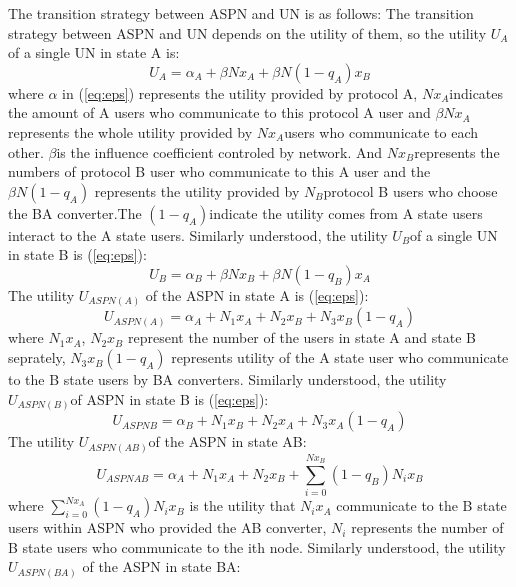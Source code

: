 \documentclass{article}
\begin{document}
The transition strategy between ASPN and UN is as follows:
The transition strategy between ASPN and UN depends on the utility of them, so the utility \(U_{A}\) of a single UN
in state A is:
\begin{displaymath} \label{eq:eps}
U_{A}=\alpha_{A}+\beta Nx_{A}+\beta N(1-q_{A})x_{B}
\end{displaymath}
where \(\alpha\) in (\ref{eq:eps}) represents the utility provided by protocol A, \(Nx_{A}\)indicates the amount of
A users who communicate to this protocol A user and \(\beta Nx_{A}\) represents the whole utility provided
by \(Nx_{A}\)users who communicate to each other. \(\beta\)is the influence coefficient controled by network.
And \(Nx_{B}\)represents the numbers of protocol B user who communicate to this A user and the \(\beta N(1-q_{A})\)
represents the utility provided by \(N_{B}\)protocol B users who choose the BA converter.The \((1-q_{A})\)indicate the
utility comes from A state users interact to the A state users. Similarly understood, the utility \(U_{B}\)of a single UN in
state B is (\ref{eq:eps}):
\begin{displaymath}\label{eq:eps}
U_{B}=\alpha_{B}+\beta Nx_{B}+\beta N(1-q_{B})x_{A}
\end{displaymath}
The utility \(U_{ASPN(A)}\) of the ASPN in state A is (\ref{eq:eps}):
\begin{displaymath}\label{eq:eps}
U_{ASPN(A)}=\alpha_{A}+N_{1}x_{A}+N_{2}x_{B}+N_{3}x_{B}(1-q_{A})
\end{displaymath}
where \(N_{1}x_{A}\), \(N_{2}x_{B}\) represent the number of the users in state A and state B seprately,
\(N_{3}x_{B}(1-q_{A})\) represents utility of the A state user who communicate to the B state users by
BA converters. Similarly understood, the utility \(U_{ASPN(B)}\)of ASPN in state B is (\ref{eq:eps}):
\begin{displaymath} \label{eq:eps}
U_{ASPN{B}}=\alpha_{B}+N_{1}x_{B}+N_{2}x_{A}+N_{3}x_{A}(1-q_{A})
\end{displaymath}
The utility \(U_{ASPN(AB)}\)of the ASPN in state AB:
\begin{displaymath}
U_{ASPN{AB}}=\alpha_{A}+N_{1}x_{A}+N_{2}x_{B}+\sum_{i=0}^{Nx_{B}}(1-q_{B})N_{i}x_{B}
\end{displaymath}
where \(\sum_{i=0}^{Nx_{A}}(1-q_{A})N_{i}x_{B}\) is the utility that \(N_{i}x_{A}\) communicate to the B state users
within ASPN who provided the AB converter, \(N_{i}\) represents the number of B state users who communicate to the ith node.
Similarly understood, the utility \(U_{ASPN(BA)}\) of the ASPN in state BA:
\end{document}
